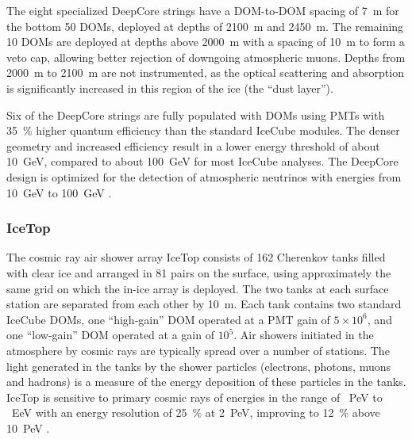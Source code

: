 The eight specialized DeepCore strings have a DOM-to-DOM spacing of
\SI{7}{\meter} for the bottom 50 DOMs, deployed at depths of
\SI{2100}{\meter} and \SI{2450}{\meter}.  The remaining 10 DOMs are
deployed at depths above \SI{2000}{\meter} with a spacing of
\SI{10}{\meter} to form a veto cap, allowing better rejection of downgoing
atmospheric muons.  Depths from \SI{2000}{\meter} to \SI{2100}{\meter}
are not instrumented, as the optical scattering and absorption is
significantly increased in this region of the ice (the ``dust layer'').

Six of the DeepCore strings are fully populated with
DOMs using PMTs with \SI{35}{\%} higher quantum efficiency than the
standard IceCube modules.  The denser geometry and increased efficiency
result in a lower energy threshold of about
\SI{10}{\giga\electronvolt}, compared to about
\SI{100}{\giga\electronvolt} for most IceCube analyses. The DeepCore design
is optimized for the detection of atmospheric neutrinos with energies
from \SI{10}{\giga\electronvolt} to \SI{100}{\giga\electronvolt}
\cite{ICECUBE:DC}. 

\subsubsection{IceTop}

The cosmic ray air shower array IceTop \cite{ICECUBE:IceTop} consists
of \num{162} Cherenkov tanks filled with clear ice and arranged in
\num{81} pairs on the
surface, using approximately the same grid on which the in-ice
array is deployed.  The two tanks at each surface station are separated from
each other by \SI{10}{\meter}. Each tank contains two standard IceCube
DOMs, one ``high-gain'' DOM operated at a PMT gain of $5 \times 10^{6}$, and one
``low-gain'' DOM operated at a gain of $10^{5}$. Air showers initiated in the atmosphere by cosmic rays are typically
spread over a number of stations. The light generated in the tanks by the
shower particles (electrons, photons, muons and hadrons) is a measure of
the energy deposition of these particles in the tanks. IceTop is sensitive to
primary cosmic rays of energies in the range of \SI{}{PeV} to \SI{}{EeV}
with an energy resolution of \SI{25}{\%} at \SI{2}{PeV}, improving to
\SI{12}{\%} above \SI{10}{PeV} \cite{IT:measurement}.




